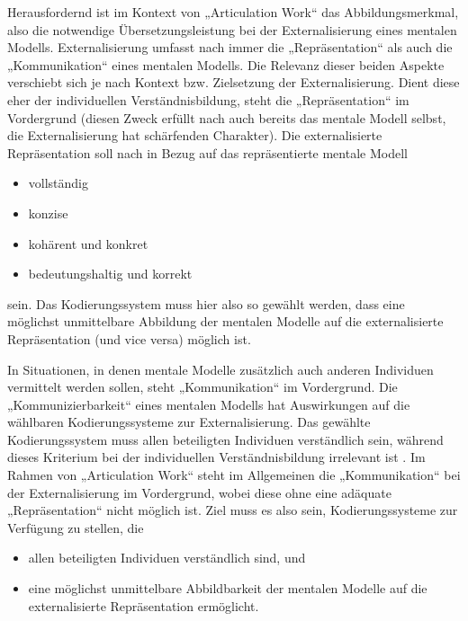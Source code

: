 Herausfordernd ist im Kontext von „Articulation Work“ das Abbildungsmerkmal, also die notwendige Übersetzungsleistung bei der Externalisierung eines mentalen Modells. Externalisierung umfasst nach \citet{Hanke06} immer die „Repräsentation“ als auch die „Kommunikation“ eines mentalen Modells. Die Relevanz dieser beiden Aspekte verschiebt sich je nach Kontext bzw. Zielsetzung der Externalisierung. Dient diese eher der individuellen Verständnisbildung, steht die „Repräsentation“ im Vordergrund (diesen Zweck erfüllt nach \citep{Seel91} auch bereits das mentale Modell selbst, die Externalisierung hat schärfenden Charakter). Die externalisierte Repräsentation soll nach \citet[][S. 187]{Seel91} in Bezug auf das repräsentierte mentale Modell
\begin{itemize}
	\item vollständig 
	\item konzise
	\item kohärent und konkret
	\item bedeutungshaltig und korrekt
\end{itemize}
sein. Das \wichtig Kodierungssystem muss hier also so gewählt werden, dass eine möglichst unmittelbare Abbildung der mentalen Modelle auf die externalisierte Repräsentation (und vice versa) möglich ist. 

In Situationen, in denen mentale Modelle zusätzlich auch anderen Individuen vermittelt werden sollen, steht „Kommunikation“ im Vordergrund. Die „Kommunizierbarkeit“ eines mentalen Modells hat Auswirkungen auf die wählbaren Kodierungssysteme zur Externalisierung. Das gewählte Kodierungssystem muss allen beteiligten Individuen verständlich sein, während dieses Kriterium bei der individuellen Verständnisbildung irrelevant ist \citep{Hanke06}. Im Rahmen von „Articulation Work“ steht im Allgemeinen die „Kommunikation“ bei der Externalisierung im Vordergrund, wobei diese ohne eine adäquate „Repräsentation“ nicht möglich ist. \label{anforderungen_seel} Ziel muss es also sein, Kodierungssysteme zur Verfügung zu stellen, die 
\begin{itemize}
	\item allen beteiligten Individuen verständlich sind, und
	\item eine möglichst unmittelbare Abbildbarkeit der mentalen Modelle auf die externalisierte Repräsentation ermöglicht.
\end{itemize}

